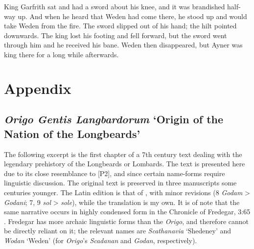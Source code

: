\bpb King Garfrith sat and had a sword about his knee, and it was brandished half-way up.  And when he heard that Weden had come there, he stood up and would take Weden from the fire.  The sword slipped out of his hand; the hilt pointed downwards.  The king lost his footing and fell forward, but the sword went through him and he received his bane.  Weden then disappeared, but Ayner was king there for a long while afterwards.\epb\epg

\section{Appendix}

\subsection{\emph{Origo Gentis Langbardorum} ‘Origin of the Nation of the Longbeards’}

The following excerpt is the first chapter of a 7th century text dealing with the legendary prehistory of the Longbeards or Lombards.  The text is presented here due to its close resemblance to [P2], and since certain name-forms require linguistic discussion.
The original text is preserved in three manuscripts some centuries younger.  The Latin edition is that of \textcite{Waitz1878}, with minor revisions (8 \emph{Godam} > \emph{Godani}; 7, 9 \emph{sol} > \emph{sole}), while the translation is my own.
It is of note that the same narrative occurs in highly condensed form in the Chronicle of Fredegar, 3:65 \parencite[110]{Krusch1888}.  Fredegar has more archaic linguistic forms than the \emph{Origo}, and therefore cannot be directly reliant on it; the relevant names are \emph{Scathanavia} ‘Shedeney’ and \emph{Wodan} ‘Weden’ (for \emph{Origo}’s \emph{Scadanan} and \emph{Godan}, respectively).

